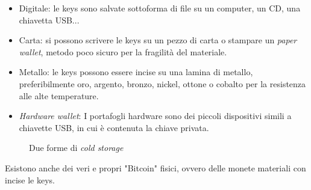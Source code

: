 \documentclass {article}
\begin{document}
\begin{itemize}
\item Digitale: le keys sono salvate sottoforma di file su un computer, un CD, una chiavetta USB...
\item Carta: si possono scrivere le keys su un pezzo di carta o stampare un \textit{paper wallet}, metodo poco sicuro per la fragilità del materiale.
\item Metallo: le keys possono essere incise su una lamina di metallo, preferibilmente oro, argento, bronzo, nickel, ottone o cobalto per la resistenza alle alte temperature.
\item \textit{Hardware wallet}: I portafogli hardware sono dei piccoli dispositivi simili a chiavette USB, in cui è contenuta la chiave privata.
\end{itemize}

\begin{figure}[htb!]

 
\caption{Due forme di \textit{cold storage}}

\end{figure}
\vspace {0.2cm}
\noindent
%
Esistono anche dei veri e propri "Bitcoin" fisici, ovvero delle monete materiali con incise le keys.
\end{document}
